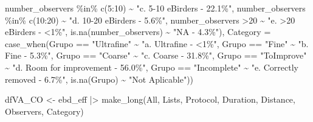 \documentclass[
]{article}
\newenvironment{Shaded}{\begin{snugshade}}{\end{snugshade}}
\newcommand{\AttributeTok}[1]{\textcolor[rgb]{0.77,0.63,0.00}{#1}}
\newcommand{\DecValTok}[1]{\textcolor[rgb]{0.00,0.00,0.81}{#1}}
\newcommand{\FunctionTok}[1]{\textcolor[rgb]{0.00,0.00,0.00}{#1}}
\newcommand{\NormalTok}[1]{#1}
\newcommand{\OtherTok}[1]{\textcolor[rgb]{0.56,0.35,0.01}{#1}}
\newcommand{\SpecialCharTok}[1]{\textcolor[rgb]{0.00,0.00,0.00}{#1}}
\newcommand{\StringTok}[1]{\textcolor[rgb]{0.31,0.60,0.02}{#1}}
\begin{document}
\begin{Shaded}
\begin{Highlighting}[]
\NormalTok{                               number\_observers }\SpecialCharTok{\%in\%} \FunctionTok{c}\NormalTok{(}\DecValTok{5}\SpecialCharTok{:}\DecValTok{10}\NormalTok{) }\SpecialCharTok{\textasciitilde{}} \StringTok{"c. 5{-}10 eBirders {-} 22.1\%"}\NormalTok{,}
\NormalTok{                              number\_observers }\SpecialCharTok{\%in\%} \FunctionTok{c}\NormalTok{(}\DecValTok{10}\SpecialCharTok{:}\DecValTok{20}\NormalTok{) }\SpecialCharTok{\textasciitilde{}} \StringTok{"d. 10{-}20 eBirders {-} 5.6\%"}\NormalTok{,}
\NormalTok{                              number\_observers }\SpecialCharTok{\textgreater{}}\DecValTok{20} \SpecialCharTok{\textasciitilde{}} \StringTok{"e. \textgreater{}20 eBirders {-} \textless{}1\%"}\NormalTok{,}
                              \FunctionTok{is.na}\NormalTok{(number\_observers) }\SpecialCharTok{\textasciitilde{}} \StringTok{"NA {-} 4.3\%"}\NormalTok{),}
         \AttributeTok{Category =} \FunctionTok{case\_when}\NormalTok{(Grupo }\SpecialCharTok{==} \StringTok{"Ultrafine"} \SpecialCharTok{\textasciitilde{}} \StringTok{"a. Ultrafine {-} \textless{}1\%"}\NormalTok{,}
\NormalTok{                              Grupo }\SpecialCharTok{==} \StringTok{"Fine"} \SpecialCharTok{\textasciitilde{}} \StringTok{"b. Fine {-} 5.3\%"}\NormalTok{,}
\NormalTok{                              Grupo }\SpecialCharTok{==} \StringTok{"Coarse"} \SpecialCharTok{\textasciitilde{}} \StringTok{"c. Coarse {-} 31.8\%"}\NormalTok{,}
\NormalTok{                              Grupo }\SpecialCharTok{==} \StringTok{"ToImprove"} \SpecialCharTok{\textasciitilde{}} \StringTok{"d. Room for improvement {-} 56.0\%"}\NormalTok{,}
\NormalTok{                              Grupo }\SpecialCharTok{==} \StringTok{"Incomplete"} \SpecialCharTok{\textasciitilde{}} \StringTok{"e. Correctly removed {-} 6.7\%"}\NormalTok{,}
                              \FunctionTok{is.na}\NormalTok{(Grupo) }\SpecialCharTok{\textasciitilde{}} \StringTok{"Not Aplicable"}\NormalTok{))}

\NormalTok{dfVA\_CO }\OtherTok{\textless{}{-}}\NormalTok{ ebd\_eff }\SpecialCharTok{|\textgreater{}}
  \FunctionTok{make\_long}\NormalTok{(All, Lists, Protocol, Duration, Distance, Observers, Category)}


\end{Highlighting}
\end{Shaded}
\end{document}
